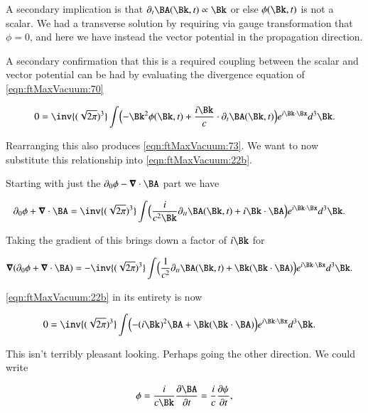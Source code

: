 A secondary implication is that $\partial_t \BA(\Bk, t) \propto \Bk$ or else $\phi(\Bk, t)$ is not a scalar.  We had a transverse solution by requiring via gauge transformation that $\phi = 0$, and here we have instead the vector potential in the propagation direction.

A secondary confirmation that this is a required coupling between the scalar and vector potential can be had by evaluating the divergence equation of \autoref{eqn:ftMaxVacuum:70}

\begin{align}\label{eqn:ftMaxVacuum:72b}
0 = 
\inv{(\sqrt{2 \pi})^3} \int 
\Bigl(
- \Bk^2 \phi(\Bk, t) + \frac{i\Bk}{c} \cdot \partial_t \BA(\Bk, t)
\Bigr)
e^{i \Bk \cdot \Bx } d^3 \Bk.
\end{align}

Rearranging this also produces \autoref{eqn:ftMaxVacuum:73}.  We want to now substitute this relationship into \autoref{eqn:ftMaxVacuum:22b}.

Starting with just the $\partial_0 \phi - \spacegrad \cdot \BA$ part we have

\begin{align}\label{eqn:ftMaxVacuum:74}
\partial_0 \phi + \spacegrad \cdot \BA
&=
\inv{(\sqrt{2 \pi})^3} \int 
\Bigl(
\frac{i}{c^2 \Bk} \partial_{tt} \BA(\Bk, t) + i \Bk \cdot \BA
\Bigr)
e^{i \Bk \cdot \Bx } d^3 \Bk.
\end{align}

Taking the gradient of this brings down a factor of $i\Bk$ for

\begin{align}\label{eqn:ftMaxVacuum:74b}
\spacegrad (\partial_0 \phi + \spacegrad \cdot \BA)
&=
-\inv{(\sqrt{2 \pi})^3} \int 
\Bigl(
\frac{1}{c^2} \partial_{tt} \BA(\Bk, t) + \Bk (\Bk \cdot \BA)
\Bigr)
e^{i \Bk \cdot \Bx } d^3 \Bk.
\end{align}

\autoref{eqn:ftMaxVacuum:22b} in its entirety is now

\begin{align}\label{eqn:ftMaxVacuum:75}
0 &=
\inv{(\sqrt{2 \pi})^3} \int 
\Bigl(
- (i\Bk)^2 \BA
+ \Bk (\Bk \cdot \BA)
\Bigr)
e^{i \Bk \cdot \Bx } d^3 \Bk.
\end{align}

This isn't terribly pleasant looking.  Perhaps going the other direction.  We could write

\begin{align}\label{eqn:ftMaxVacuum:76}
\phi = \frac{i}{c \Bk} \PD{t}{\BA} = \frac{i}{c} \PD{t}{\psi},
\end{align}

